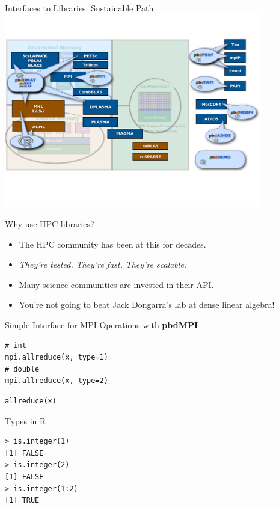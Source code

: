 \begin{frame}{\pbdR Interfaces to Libraries: Sustainable Path}
  \vspace{-1ex}
  \centering\includegraphics[trim=0cm 5cm 0cm 3cm,clip=true,width=0.85\textwidth]
  {../common/pics/hardware/ParallelHardware27.pdf}
  \scriptsize
  \begin{block}{Why use HPC libraries?}
    \begin{itemize}[<+-|alert@+>]
    \item The HPC community has been at this for decades.
    \item \emph{They're tested.} \emph{They're
        fast.}  \emph{They're scalable.}
    \item Many science communities are invested in their API.
    \item You're not going to beat Jack Dongarra's lab at dense linear
      algebra!
    \end{itemize}
  \end{block}
\end{frame}


\begin{frame}[fragile]
  \begin{block}{Simple Interface for MPI Operations with \textbf{pbdMPI}}\pause
\begin{minipage}[t]{.475\textwidth}
\begin{lstlisting}[title=Rmpi]
# int
mpi.allreduce(x, type=1)
# double
mpi.allreduce(x, type=2)
\end{lstlisting}
\end{minipage}
\hfill
\begin{minipage}[t]{.475\textwidth}
\begin{lstlisting}[title=pbdMPI]
allreduce(x)
\end{lstlisting}
\end{minipage}
\end{block}
%
\begin{block}{Types in R}
\vspace{-.2cm}
\begin{lstlisting}
> is.integer(1)
[1] FALSE
> is.integer(2)
[1] FALSE
> is.integer(1:2)
[1] TRUE
\end{lstlisting}
\end{block}
\end{frame}




